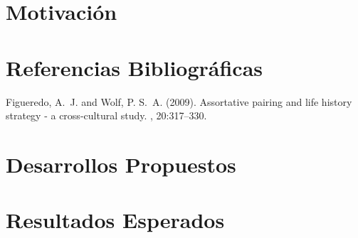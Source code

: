 \documentclass[12pt]{article} %
\begin{document}

\section{Motivación} %




\section{Referencias Bibliográficas} %

\renewcommand\refname{\textbf{Referencias}}
\begin{thebibliography}{99} %

Figueredo, A.~J. and Wolf, P. S.~A. (2009).
\newblock Assortative pairing and life history strategy - a cross-cultural
  study.
, 20:317--330.
 
\end{thebibliography}


\section{Desarrollos Propuestos} %



\section{Resultados Esperados} %
\end{document}
